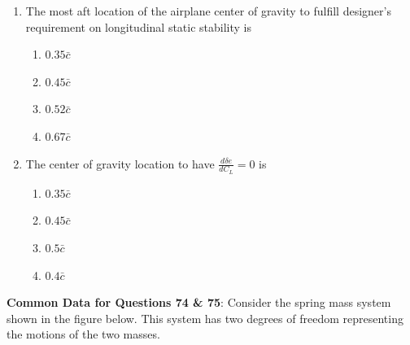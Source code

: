 \documentclass{article}
\begin{document}
\begin{enumerate}
    \item The most aft location of the airplane center of gravity to fulfill designer's requirement on longitudinal static stability is
    \begin{multicols}{4}
    \begin{enumerate}
        \item $0.35 \bar{c}$
        \item $0.45 \bar{c}$
        \item $0.52 \bar{c}$
        \item $0.67 \bar{c}$
    \end{enumerate}
    \end{multicols}
    

    \item The center of gravity location to have $\frac{d \delta e}{d C_L} = 0$ is
    \begin{multicols}{4}
    \begin{enumerate}
        \item $0.35 \bar{c}$
        \item $0.45 \bar{c}$
        \item $0.5 \bar{c}$
        \item $0.4 \bar{c}$
    \end{enumerate}
    \end{multicols}
    
\end{enumerate}

\textbf{Common Data for Questions 74 \& 75}: Consider the spring mass system shown in the figure below. This system has two degrees of freedom representing the motions of the two masses.

\begin{figure}[H]
    \centering
    
    \caption{}
    \label{}
\end{figure}
\end{document}
